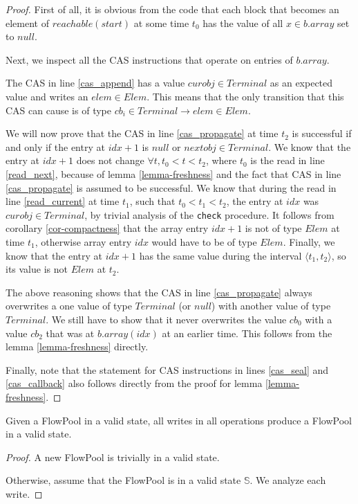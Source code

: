 \documentclass[runningheads,a4paper]{llncs}
\begin{document}
\begin{proof}
First of all, it is obvious from the code that each block that becomes
an element of $reachable(start)$ at some time $t_0$ has the value of
all $x \in b.array$ set to $null$.

Next, we inspect all the CAS instructions that operate on entries of
$b.array$.

The CAS in line \ref{cas_append} has a value $curobj \in Terminal$ as
an expected value and writes an $elem \in Elem$.
This means that the only transition that this CAS
can cause is of type $cb_i \in Terminal \rightarrow elem \in Elem$.

We will now prove that the CAS in line \ref{cas_propagate} at time $t_2$ is successful if and
only if the entry at $idx + 1$ is $null$ or $nextobj \in
Terminal$.
We know that the entry at $idx + 1$ does not change $\forall t, t_0 < t < t_2$,
where $t_0$ is the read in line \ref{read_next},
because of lemma \ref{lemma-freshness} and the fact that CAS in line \ref{cas_propagate} is assumed to be successful.
We know that during the read in line \ref{read_current} at time $t_1$,
such that $t_0 < t_1 < t_2$, the entry at $idx$ was $curobj \in
Terminal$, by trivial analysis of the \verb=check= procedure.
It follows from corollary \ref{cor-compactness} that the array entry $idx
+ 1$ is not of type $Elem$ at time $t_1$, otherwise array entry $idx$
would have to be of type $Elem$.
Finally, we know that the entry at $idx + 1$ has the same value during
the interval $\langle t_1, t_2 \rangle$, so its value is not $Elem$ at $t_2$.

The above reasoning shows that the CAS in line \ref{cas_propagate}
always overwrites a one value of type $Terminal$ (or $null$) with
another value of type $Terminal$. We still have to show that it never
overwrites the value $cb_0$ with a value $cb_2$ that was at
$b.array(idx)$ at an earlier time. This follows from the
lemma \ref{lemma-freshness} directly.

Finally, note that the statement for CAS instructions in lines \ref{cas_seal} and
\ref{cas_callback} also follows directly from the proof for lemma \ref{lemma-freshness}.
\end{proof}


\begin{lemma}\label{lemma-valid}
Given a FlowPool in a valid state, all writes in all operations produce a FlowPool in a valid state.
\end{lemma}

\begin{proof}
A new FlowPool is trivially in a valid state.

Otherwise, assume that the FlowPool is in a valid state
$\mathbb{S}$. We analyze each write.
\end{proof}
\end{document}
